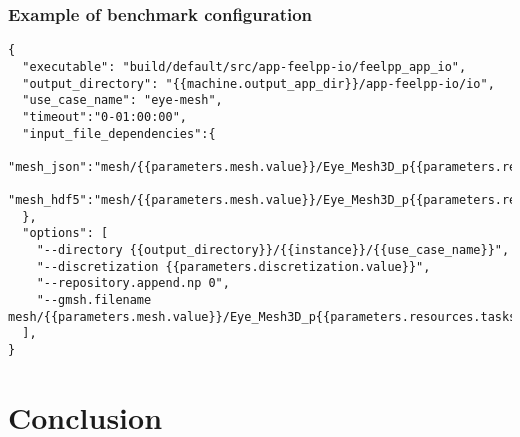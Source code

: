 \documentclass[aspectratio=169]{beamer}
\begin{document}
\begin{frame}[fragile]
  \frametitle{Example of benchmark configuration}


  \begin{lrbox}{\mintedbox}
  \begin{verbatim}
{
  "executable": "build/default/src/app-feelpp-io/feelpp_app_io",
  "output_directory": "{{machine.output_app_dir}}/app-feelpp-io/io",
  "use_case_name": "eye-mesh",
  "timeout":"0-01:00:00",
  "input_file_dependencies":{
      "mesh_json":"mesh/{{parameters.mesh.value}}/Eye_Mesh3D_p{{parameters.resources.tasks.value}}.json",
      "mesh_hdf5":"mesh/{{parameters.mesh.value}}/Eye_Mesh3D_p{{parameters.resources.tasks.value}}.h5"
  },
  "options": [
    "--directory {{output_directory}}/{{instance}}/{{use_case_name}}",
    "--discretization {{parameters.discretization.value}}",
    "--repository.append.np 0",
    "--gmsh.filename mesh/{{parameters.mesh.value}}/Eye_Mesh3D_p{{parameters.resources.tasks.value}}.json"
  ],
}
  \end{verbatim}
  \end{lrbox}

  \resizebox{\textwidth}{!}{\usebox{\mintedbox}}




\end{frame}


\section{Conclusion}

\end{document}
